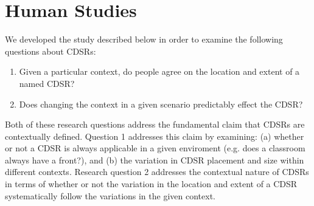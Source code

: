 \documentclass[11pt,letterpaper]{article}
\begin{document}


\section{Human Studies}

We developed the study described below in order to examine the following questions about CDSRs:
\begin{enumerate}
	\item Given a particular context, do people agree on the location and extent of a named CDSR?
	\item Does changing the context in a given scenario predictably effect the CDSR?
\end{enumerate}

Both of these research questions address the fundamental claim that CDSRs are contextually defined. Question 1 addresses this claim by examining: (a) whether or not a CDSR is always applicable in a given enviroment (e.g. does a classroom always have a front?), and (b) the variation in CDSR placement and size within different contexts. Research question 2 addresses the contextual nature of CDSRs in terms of whether or not the variation in the location and extent of a CDSR systematically follow the variations  in the given context. 

\end{document}
